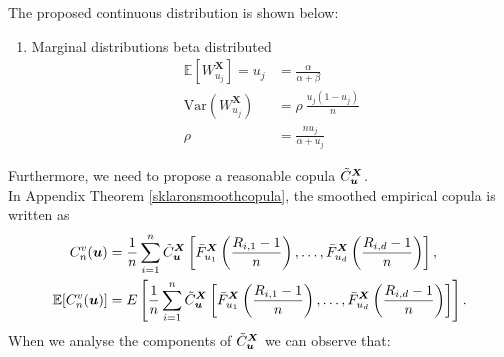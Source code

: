 \documentclass[12pt]{report}
\newcommand{\1}{\mathbf{1}}
\begin{document}
\newpage
The proposed continuous distribution is shown below:
\begin{enumerate}
\item Marginal distributions beta distributed
\begin{align*}
\mathbb{E}[W^{\boldsymbol{X}}_{u_{j}}] = u_{j} &= \frac{\alpha}{\alpha + \beta} \\
\mathrm{Var}(W^{\boldsymbol{X}}_{u_{j}}) &= \rho \: \frac{u_{j} (1 - u_{j})}{n}\\
\rho &= \frac{n u_{j}}{\alpha + u_{j}}
\end{align*}
\end{enumerate}

Furthermore, we need to propose a reasonable copula $\Tilde{C}_{\boldsymbol{u}}^{\boldsymbol{X}}$. \\
\vspace{0.5cm}
In Appendix Theorem \ref{sklaronsmoothcopula}, the smoothed empirical copula is written as
\begin{align*}
C_{n}^{v}(\boldsymbol{u}) &= \frac{1}{n} \sum\limits_{i = 1}^{n} \Tilde{C}_{\boldsymbol{u}}^{\boldsymbol{X}} \left[\Bar{F}_{u_{1}}^{\boldsymbol{X}}\left(\frac{R_{i,1} - 1}{n}\right), \dots, \Bar{F}_{u_{d}}^{\boldsymbol{X}}\left(\frac{R_{i,d} - 1}{n}\right) \right],\\
\mathbb{E}[C_{n}^{v}(\boldsymbol{u})] &= E \left[ \frac{1}{n} \sum\limits_{i = 1}^{n} \Tilde{C}_{\boldsymbol{u}}^{\boldsymbol{X}} \left[\Bar{F}_{u_{1}}^{\boldsymbol{X}}\left(\frac{R_{i,1} - 1}{n}\right), \dots, \Bar{F}_{u_{d}}^{\boldsymbol{X}}\left(\frac{R_{i,d} - 1}{n}\right) \right] \right].
\end{align*}
When we analyse the components of $\Tilde{C}_{\boldsymbol{u}}^{\boldsymbol{X}}$ \parencite{KojadinovicYi2024Smooth} we can observe that:
\end{document}
